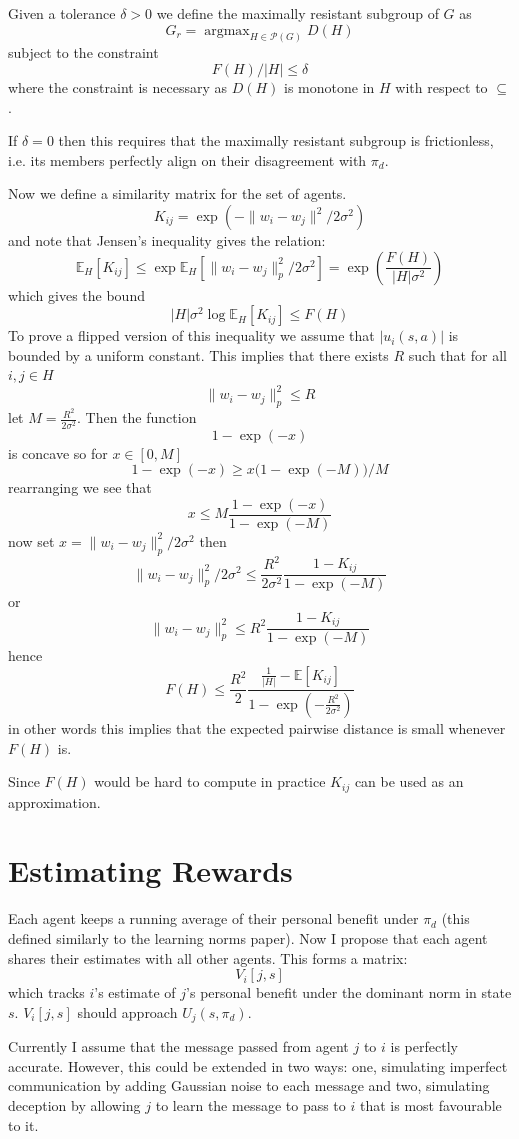 \documentclass[11pt]{article}
\theoremstyle{definition}
\theoremstyle{remark}
\begin{document}
Given a tolerance $\delta > 0$ we define the maximally resistant subgroup of $G$
as
\[ G_r = \operatorname{argmax}_{H \in \mathcal P(G)}D(H) \]
subject to the constraint
\[ F(H)/|H| \leq \delta \]
where the constraint is necessary as $D(H)$ is monotone in $H$ with respect to $\subseteq$.

If $\delta = 0$ then this requires that the maximally resistant subgroup is frictionless, i.e.
its members perfectly align on their disagreement with $\pi_d$.

Now we define a similarity matrix for the set of agents.
\[ K_{ij} = \exp(- \| w_i - w_j \|^2 /2\sigma^2) \]
and note that Jensen's inequality gives the relation:
\[ \mathbb E_H[K_{ij}] \leq \exp \mathbb E_H[\| w_i - w_j \|^2_p / 2\sigma^2] =  \exp (\frac{F(H)}{|H|\sigma^2}) \]
which gives the bound
\[ |H|\sigma^2 \log \mathbb E_H[K_{ij}] \leq F(H) \]
To prove a flipped version of this inequality we assume that $|u_i(s, a)|$ is bounded by a uniform constant.
This implies that there exists $R$ such that for all $i, j \in H$
\[ \| w_i - w_j \|_p^2 \leq R \]
let $M = \frac{R^2}{2\sigma^2}$. Then the function
\[ 1 - \exp(-x) \]
is concave so for $x \in [0, M]$
\[ 1 - \exp(-x) \geq x\Big(1 - \exp(-M)\Big)/M \]
rearranging we see that
\[ x \leq M\frac{1 - \exp(-x)}{1 - \exp(-M)} \]
now set $x = \|w_i - w_j \|_p^2/2\sigma^2$
then
\[ \|w_i - w_j \|_p^2/2\sigma^2 \leq \frac{R^2}{2\sigma^2}\frac{1 - K_{ij}}{1 - \exp(-M)} \]
or
\[ \|w_i - w_j \|_p^2 \leq R^2\frac{1 - K_{ij}}{1 - \exp(-M)} \]
hence
\[ F(H) \leq \frac{R^2}{2}\frac{\frac{1}{|H|} - \mathbb E[K_{ij}]}{1 - \exp(-\frac{R^2}{2\sigma^2})} \]
in other words this implies that the expected pairwise distance is small whenever $F(H)$ is.

Since $F(H)$ would be hard to compute in practice $K_{ij}$ can be used as an approximation.

\section{Estimating Rewards}
Each agent keeps a running average of their personal benefit under $\pi_d$
(this defined similarly to the learning norms paper). Now I propose that each agent
shares their estimates with all other agents. This forms a matrix:
\[ V_i[j, s] \]
which tracks $i$'s estimate of $j$'s personal benefit under the dominant norm in state $s$.
$V_i[j, s]$ should approach $U_j(s, \pi_d)$.

Currently I assume that the message passed from agent $j$ to $i$ is perfectly accurate.
However, this could be extended in two ways: one, simulating imperfect communication
by adding Gaussian noise to each message and two, simulating deception by allowing $j$
to learn the message to pass to $i$ that is most favourable to it.
\end{document}
